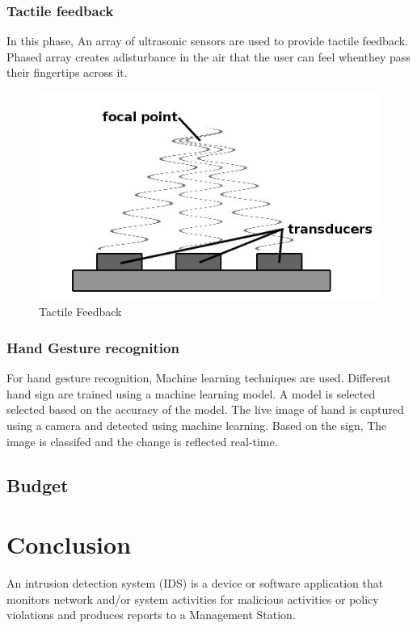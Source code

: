\documentclass{fisatproject}
\begin{document}
 \subsection{Tactile feedback}
    In this phase, An array of ultrasonic sensors are used to provide tactile feedback.
    Phased array creates adisturbance in the air that the user can feel whenthey pass their fingertips across it.
    \begin{figure}[h!]
        \begin{center}
        \includegraphics[scale=.8]{images/img1.jpg}
        \caption{Tactile Feedback}
        \end{center}
        \end{figure}
 \subsection{Hand Gesture recognition}
     For hand gesture recognition, Machine learning techniques are used.
     Different hand sign are trained using a machine learning model.
     A model is selected selected based on the accuracy of the model.
     The live image of hand is captured using a camera and detected using machine learning.
     Based on the sign, The image is classifed and the change is reflected real-time.
 \section{Budget}


\chapter{Conclusion}

An intrusion detection system (IDS) \cite{nist} is a device or software application that monitors network and/or system activities for malicious activities or policy violations and produces reports to a Management Station.
\end{document}

